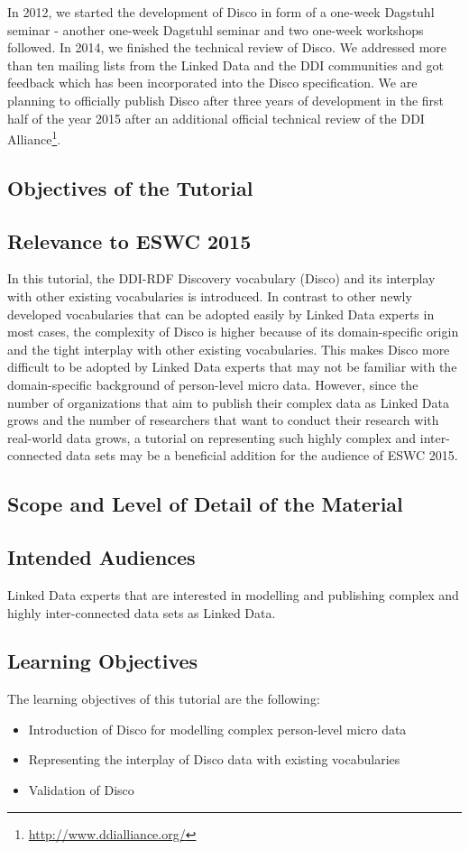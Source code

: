 \documentclass{llncs}
\begin{document}
In 2012, we started the development of Disco in form of a one-week Dagstuhl seminar - another one-week Dagstuhl seminar and two one-week workshops followed.  
In 2014, we finished the technical review of Disco.
We addressed more than ten mailing lists from the Linked Data and the DDI communities and got feedback which has been incorporated into the Disco specification.
We are planning to officially publish Disco after three years of development in the first half of the year 2015 after an additional official technical review of the DDI Alliance\footnote{\url{http://www.ddialliance.org/}}.

\subsection{Objectives of the Tutorial} 

\subsection{Relevance to ESWC 2015}
In this tutorial, the DDI-RDF Discovery vocabulary (Disco) and its interplay with other existing vocabularies is introduced. In contrast to other newly developed vocabularies that can be adopted easily by Linked Data experts in most cases, the complexity of Disco is higher because of its domain-specific origin and the tight interplay with other existing vocabularies. This makes Disco more difficult to be adopted by Linked Data experts that may not be familiar with the domain-specific background of person-level micro data. However, since the number of organizations that aim to publish their complex data as Linked Data grows and the number of researchers that want to conduct their research with real-world data grows, a tutorial on representing such highly complex and inter-connected data sets may be a beneficial addition for the audience of ESWC 2015.

\subsection{Scope and Level of Detail of the Material}

\subsection{Intended Audiences}
Linked Data experts that are interested in modelling and publishing complex and highly inter-connected data sets as Linked Data.

\subsection{Learning Objectives}
The learning objectives of this tutorial are the following:
\begin{itemize} 
\item Introduction of Disco for modelling complex person-level micro data
\item Representing the interplay of Disco data with existing vocabularies
\item Validation of Disco
\end{itemize}
\end{document}
